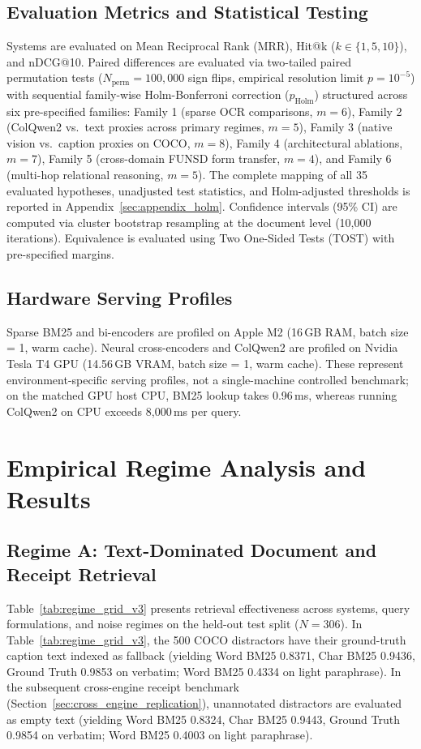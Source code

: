 \subsection{Evaluation Metrics and Statistical Testing}
Systems are evaluated on Mean Reciprocal Rank (MRR), Hit@k ($k \in \{1, 5, 10\}$), and nDCG@10. Paired differences are evaluated via two-tailed paired permutation tests ($N_{\text{perm}}=100{,}000$ sign flips, empirical resolution limit $p = 10^{-5}$) with sequential family-wise Holm-Bonferroni correction ($p_{\text{Holm}}$) structured across six pre-specified families: Family 1 (sparse OCR comparisons, $m=6$), Family 2 (ColQwen2 vs.\ text proxies across primary regimes, $m=5$), Family 3 (native vision vs.\ caption proxies on COCO, $m=8$), Family 4 (architectural ablations, $m=7$), Family 5 (cross-domain FUNSD form transfer, $m=4$), and Family 6 (multi-hop relational reasoning, $m=5$). The complete mapping of all 35 evaluated hypotheses, unadjusted test statistics, and Holm-adjusted thresholds is reported in Appendix~\ref{sec:appendix_holm}. Confidence intervals (95\% CI) are computed via cluster bootstrap resampling at the document level (10,000 iterations). Equivalence is evaluated using Two One-Sided Tests (TOST) with pre-specified margins.

\subsection{Hardware Serving Profiles}
Sparse BM25 and bi-encoders are profiled on Apple M2 (16\,GB RAM, batch size = 1, warm cache). Neural cross-encoders and ColQwen2 are profiled on Nvidia Tesla T4 GPU (14.56\,GB VRAM, batch size = 1, warm cache). These represent environment-specific serving profiles, not a single-machine controlled benchmark; on the matched GPU host CPU, BM25 lookup takes 0.96\,ms, whereas running ColQwen2 on CPU exceeds 8,000\,ms per query.

\section{Empirical Regime Analysis and Results}
\label{sec:results}

\subsection{Regime A: Text-Dominated Document and Receipt Retrieval}
\label{sec:regime_a_text}

Table~\ref{tab:regime_grid_v3} presents retrieval effectiveness across systems, query formulations, and noise regimes on the held-out test split ($N=306$). In Table~\ref{tab:regime_grid_v3}, the 500 COCO distractors have their ground-truth caption text indexed as fallback (yielding Word BM25 0.8371, Char BM25 0.9436, Ground Truth 0.9853 on verbatim; Word BM25 0.4334 on light paraphrase). In the subsequent cross-engine receipt benchmark (Section~\ref{sec:cross_engine_replication}), unannotated distractors are evaluated as empty text (yielding Word BM25 0.8324, Char BM25 0.9443, Ground Truth 0.9854 on verbatim; Word BM25 0.4003 on light paraphrase).

